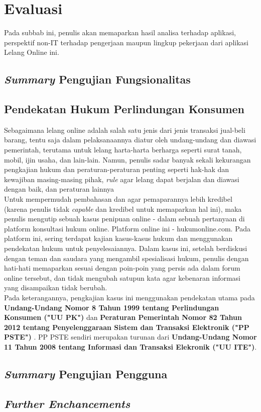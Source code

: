 \section{Evaluasi}
	Pada subbab ini, penulis akan memaparkan hasil analisa terhadap aplikasi, perspektif non-IT terhadap pengerjaan maupun lingkup pekerjaan dari aplikasi Lelang Online ini.
	
	\subsection{\textit{Summary} Pengujian Fungsionalitas}
	
	\subsection{Pendekatan Hukum Perlindungan Konsumen}
	
	Sebagaimana lelang online adalah salah satu jenis dari jenis transaksi jual-beli barang, tentu saja dalam pelaksanaannya diatur oleh undang-undang dan diawasi pemerintah, terutama untuk lelang harta-harta berharga seperti surat tanah, mobil, ijin usaha, dan lain-lain. Namun, penulis sadar banyak sekali kekurangan pengkajian hukum dan peraturan-peraturan penting seperti hak-hak dan kewajiban masing-masing pihak, \textit{rule} agar lelang dapat berjalan dan diawasi dengan baik, dan peraturan lainnya\\
	Untuk mempermudah pembahasan dan agar pemaparannya lebih kredibel (karena penulis tidak \textit{capable} dan kredibel untuk memaparkan hal ini), maka penulis mengutip sebuah kasus penipuan online - dalam sebuah pertanyaan di platform konsultasi hukum online. Platform online ini - hukumonline.com. Pada platform ini, sering terdapat kajian kasus-kasus hukum dan menggunakan pendekatan hukum untuk penyelesaiannya. Dalam kasus ini, setelah berdiskusi dengan teman dan saudara yang mengambil spesialisasi hukum, penulis dengan hati-hati memaparkan sesuai dengan poin-poin yang persis ada dalam forum online tersebut, dan tidak mengubah satupun kata agar kebenaran informasi yang disampaikan tidak berubah.\\
	\indent Pada keterangannya, pengkajian kasus ini menggunakan pendekatan utama pada \textbf{Undang-Undang Nomor 8 Tahun 1999 tentang Perlindungan Konsumen ("UU PK") } dan \textbf{Peraturan Pemerintah Nomor 82 Tahun 2012 tentang Penyelenggaraan Sistem dan Transaksi Elektronik ("PP PSTE") }. PP PSTE sendiri merupakan turunan dari \textbf{Undang-Undang Nomor 11 Tahun 2008 tentang Informasi dan Transaksi Elekronik ("UU ITE")}.
	
			
	\subsection{\textit{Summary} Pengujian Pengguna}
	
	
	\subsection{\textit{Further Enchancements}}
	

	